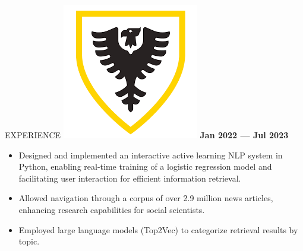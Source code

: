 \documentclass{resume}
\begin{document}
\begin{rSection}{EXPERIENCE}
\includegraphics[height=3\fontcharht\font`\B]{dal_logo.png}%
 \hfill \textbf{Jan 2022 --- Jul 2023}\vspace{-0.2cm}
\begin{itemize}
   \item Designed and implemented an interactive active learning NLP system in Python, enabling real-time training of a logistic regression model and facilitating user interaction for efficient information retrieval.\vspace{-0.22cm}
   \item Allowed navigation through a corpus of over 2.9 million news articles, enhancing research capabilities for social scientists.\vspace{-0.22cm}
   \item Employed large language models (Top2Vec) to categorize retrieval results by topic.
\end{itemize}




\end{rSection}
\end{document}
